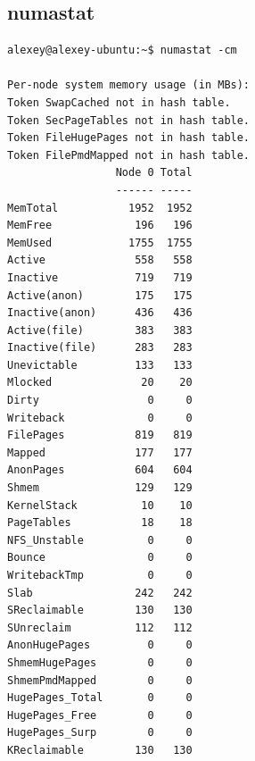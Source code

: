 \subsection{numastat}
\begin{verbatim}
alexey@alexey-ubuntu:~$ numastat -cm

Per-node system memory usage (in MBs):
Token SwapCached not in hash table.
Token SecPageTables not in hash table.
Token FileHugePages not in hash table.
Token FilePmdMapped not in hash table.
                 Node 0 Total
                 ------ -----
MemTotal           1952  1952
MemFree             196   196
MemUsed            1755  1755
Active              558   558
Inactive            719   719
Active(anon)        175   175
Inactive(anon)      436   436
Active(file)        383   383
Inactive(file)      283   283
Unevictable         133   133
Mlocked              20    20
Dirty                 0     0
Writeback             0     0
FilePages           819   819
Mapped              177   177
AnonPages           604   604
Shmem               129   129
KernelStack          10    10
PageTables           18    18
NFS_Unstable          0     0
Bounce                0     0
WritebackTmp          0     0
Slab                242   242
SReclaimable        130   130
SUnreclaim          112   112
AnonHugePages         0     0
ShmemHugePages        0     0
ShmemPmdMapped        0     0
HugePages_Total       0     0
HugePages_Free        0     0
HugePages_Surp        0     0
KReclaimable        130   130

\end{verbatim}